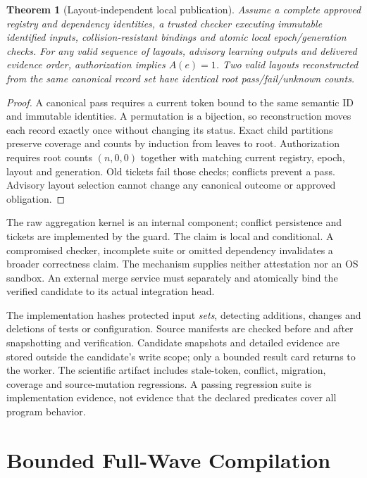 \documentclass[10pt,journal,compsoc]{IEEEtran}
\newtheorem{theorem}{Theorem}
\theoremstyle{definition}\newtheorem{definition}[theorem]{Definition}
\begin{document}
\begin{theorem}[Layout-independent local publication]\label{thm:jsafety}
Assume a complete approved registry and dependency identities, a trusted
checker executing immutable identified inputs, collision-resistant bindings
and atomic local epoch/generation checks. For any valid sequence of layouts,
advisory learning outputs and delivered evidence order, authorization implies
$A(e)=1$. Two valid layouts reconstructed from the same canonical record set
have identical root pass/fail/unknown counts.
\end{theorem}
\begin{proof}
A canonical pass requires a current token bound to the same semantic ID and
immutable identities. A permutation is a bijection, so reconstruction moves
each record exactly once without changing its status. Exact child partitions
preserve coverage and counts by induction from leaves to root. Authorization
requires root counts $(n,0,0)$ together with matching current registry, epoch,
layout and generation. Old tickets fail those checks; conflicts prevent a
pass. Advisory layout selection cannot change any canonical outcome or
approved obligation.
\end{proof}

The raw aggregation kernel is an internal component; conflict persistence
and tickets are implemented by the guard. The claim is local and conditional.
A compromised checker, incomplete suite or omitted dependency invalidates
a broader correctness claim. The mechanism supplies neither attestation nor
an OS sandbox. An external merge service must separately and atomically bind
the verified candidate to its actual integration head.

The implementation hashes protected input \emph{sets}, detecting additions,
changes and deletions of tests or configuration. Source manifests are checked
before and after snapshotting and verification. Candidate snapshots and
detailed evidence are stored outside the candidate's write scope; only a
bounded result card returns to the worker. The scientific artifact includes
stale-token, conflict, migration, coverage and source-mutation regressions.
A passing regression suite is implementation evidence, not evidence that the
declared predicates cover all program behavior.

\section{Bounded Full-Wave Compilation}\label{sec:jcompiler}
\end{document}
